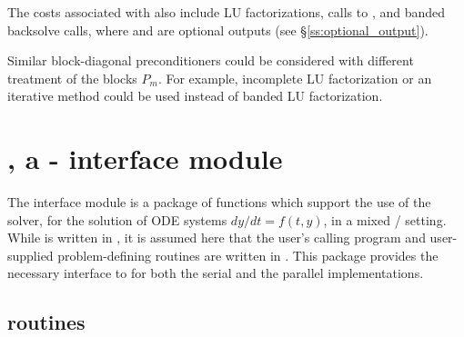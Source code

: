 The costs associated with {\cvbbdpre} also include  LU
factorizations,  calls to , and  banded
backsolve calls, where  and  are optional {\cvode}
outputs (see \S\ref{ss:optional_output}).

Similar block-diagonal preconditioners could be considered with different
treatment of the blocks $P_m$. For example, incomplete LU factorization or
an iterative method could be used instead of banded LU factorization.


\section{{\fcvode}, a {\F}-{\C} interface module}\label{ss:fcmix}

The {\fcvode} interface module is a package of {\C} functions which support
the use of the {\cvode} solver, for the solution of ODE systems 
$dy/dt = f(t,y)$, in a mixed {\F}/{\C} setting.  While {\cvode} is written
in {\C}, it is assumed here that the user's calling program and
user-supplied problem-defining routines are written in {\F}.
This package provides the necessary interface to {\cvode} for both the
serial and the parallel {\nvector} implementations.

\subsection{{\fcvode} routines}


